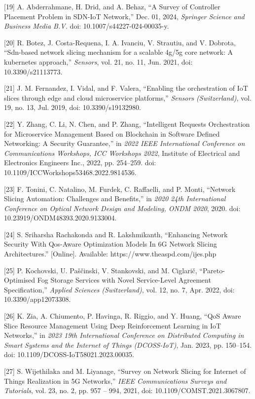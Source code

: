 {[}19{]} A. Abderrahmane, H. Drid, and A. Behaz, ``A Survey of Controller Placement Problem in SDN-IoT Network,'' Dec. 01, 2024, \emph{Springer Science and Business Media B.V.} doi: 10.1007/s44227-024-00035-y.

{[}20{]} R. Botez, J. Costa-Requena, I. A. Ivanciu, V. Strautiu, and V. Dobrota, ``Sdn-based network slicing mechanism for a scalable 4g/5g core network: A kubernetes approach,'' \emph{Sensors}, vol. 21, no. 11, Jun. 2021, doi: 10.3390/s21113773.

{[}21{]} J. M. Fernandez, I. Vidal, and F. Valera, ``Enabling the orchestration of IoT slices through edge and cloud microservice platforms,'' \emph{Sensors (Switzerland)}, vol. 19, no. 13, Jul. 2019, doi: 10.3390/s19132980.

{[}22{]} Y. Zhang, C. Li, N. Chen, and P. Zhang, ``Intelligent Requests Orchestration for Microservice Management Based on Blockchain in Software Defined Networking: A Security Guarantee,'' in \emph{2022 IEEE International Conference on Communications Workshops, ICC Workshops 2022}, Institute of Electrical and Electronics Engineers Inc., 2022, pp. 254--259. doi: 10.1109/ICCWorkshops53468.2022.9814536.

{[}23{]} F. Tonini, C. Natalino, M. Furdek, C. Raffaelli, and P. Monti, ``Network Slicing Automation: Challenges and Benefits,'' in \emph{2020 24th International Conference on Optical Network Design and Modeling, ONDM 2020}, 2020. doi: 10.23919/ONDM48393.2020.9133004.

{[}24{]} S. Sriharsha Rachakonda and R. Lakshmikanth, ``Enhancing Network Security With Qos-Aware Optimization Models In 6G Network Slicing Architectures.'' {[}Online{]}. Available: https://www.theaspd.com/ijes.php

{[}25{]} P. Kochovski, U. Paščinski, V. Stankovski, and M. Ciglarič, ``Pareto-Optimised Fog Storage Services with Novel Service-Level Agreement Specification,'' \emph{Applied Sciences (Switzerland)}, vol. 12, no. 7, Apr. 2022, doi: 10.3390/app12073308.

{[}26{]} K. Zia, A. Chiumento, P. Havinga, R. Riggio, and Y. Huang, ``QoS Aware Slice Resource Management Using Deep Reinforcement Learning in IoT Networks,'' in \emph{2023 19th International Conference on Distributed Computing in Smart Systems and the Internet of Things (DCOSS-IoT)}, Jan. 2023, pp. 150--154. doi: 10.1109/DCOSS-IoT58021.2023.00035.

{[}27{]} S. Wijethilaka and M. Liyanage, ``Survey on Network Slicing for Internet of Things Realization in 5G Networks,'' \emph{IEEE Communications Surveys and Tutorials}, vol. 23, no. 2, pp. 957 -- 994, 2021, doi: 10.1109/COMST.2021.3067807.

